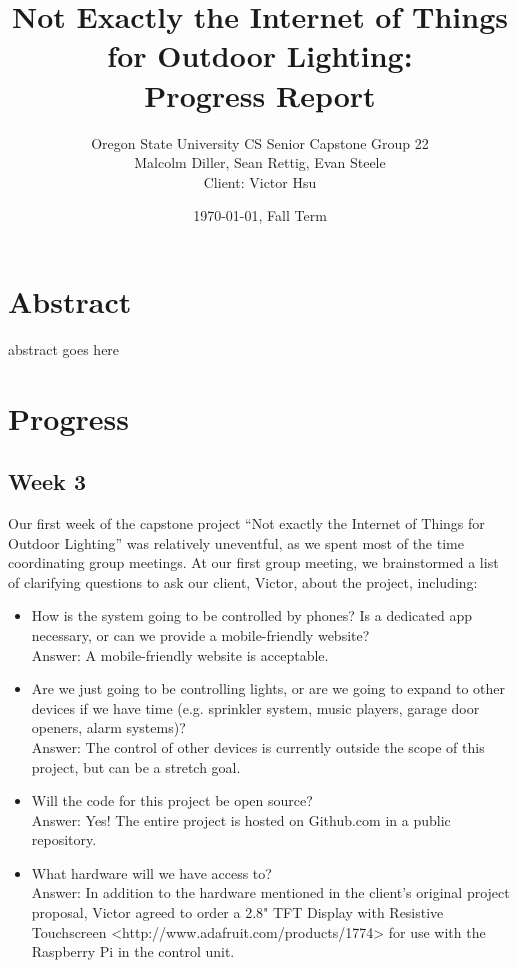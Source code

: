 \documentclass[letterpaper,10pt]{article}
\title{Not Exactly the Internet of Things for Outdoor Lighting:\\Progress Report}
\author{Oregon State University CS Senior Capstone Group 22\\Malcolm Diller, Sean Rettig, Evan Steele\\Client: Victor Hsu}
\date{\today, Fall Term}
\begin{document}
\maketitle

\section{Abstract}

abstract goes here

\pagebreak

\section{Progress}

\subsection{Week 3}

Our first week of the capstone project ``Not exactly the Internet of Things for
Outdoor Lighting'' was relatively uneventful, as we spent most of the time
coordinating group meetings.  At our first group meeting, we brainstormed a
list of clarifying questions to ask our client, Victor, about the project,
including:

\begin{itemize}
    \item How is the system going to be controlled by phones?  Is a dedicated
        app necessary, or can we provide a mobile-friendly website?\\ Answer: A
        mobile-friendly website is acceptable.
    \item Are we just going to be controlling lights, or are we going to expand
        to other devices if we have time (e.g. sprinkler system, music players,
        garage door openers, alarm systems)?\\
        Answer: The control of other devices is currently outside the scope of
        this project, but can be a stretch goal.
    \item Will the code for this project be open source?\\
        Answer: Yes!  The entire project is hosted on Github.com in a public
        repository.
    \item What hardware will we have access to?\\
        Answer: In addition to the hardware mentioned in the client's original
        project proposal, Victor agreed to order a 2.8" TFT Display with
        Resistive Touchscreen <http://www.adafruit.com/products/1774> for use
        with the Raspberry Pi in the control unit.
\end{itemize}
\end{document}
